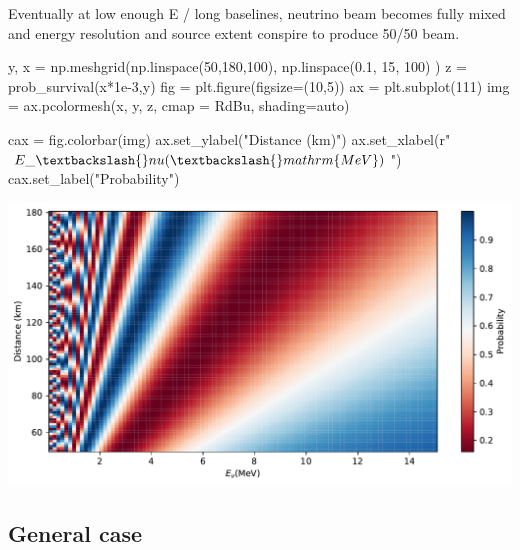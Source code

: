 \documentclass[
  letterpaper,
  DIV=11,
  numbers=noendperiod]{scrreprt}
\newenvironment{Shaded}{\begin{snugshade}}{\end{snugshade}}
\newcommand{\DecValTok}[1]{\textcolor[rgb]{0.68,0.00,0.00}{#1}}
\newcommand{\FloatTok}[1]{\textcolor[rgb]{0.68,0.00,0.00}{#1}}
\newcommand{\NormalTok}[1]{\textcolor[rgb]{0.00,0.23,0.31}{#1}}
\newcommand{\OperatorTok}[1]{\textcolor[rgb]{0.37,0.37,0.37}{#1}}
\newcommand{\StringTok}[1]{\textcolor[rgb]{0.13,0.47,0.30}{#1}}
\newcommand{\VerbatimStringTok}[1]{\textcolor[rgb]{0.13,0.47,0.30}{#1}}
\begin{document}
Eventually at low enough E / long baselines, neutrino beam becomes fully
mixed and energy resolution and source extent conspire to produce 50/50
beam.

\begin{Shaded}
\begin{Highlighting}[]
\NormalTok{y, x }\OperatorTok{=}\NormalTok{ np.meshgrid(np.linspace(}\DecValTok{50}\NormalTok{,}\DecValTok{180}\NormalTok{,}\DecValTok{100}\NormalTok{), np.linspace(}\FloatTok{0.1}\NormalTok{, }\DecValTok{15}\NormalTok{, }\DecValTok{100}\NormalTok{) )}
\NormalTok{z }\OperatorTok{=}\NormalTok{ prob\_survival(x}\OperatorTok{*}\FloatTok{1e{-}3}\NormalTok{,y)}
\NormalTok{fig }\OperatorTok{=}\NormalTok{ plt.figure(figsize}\OperatorTok{=}\NormalTok{(}\DecValTok{10}\NormalTok{,}\DecValTok{5}\NormalTok{))}
\NormalTok{ax }\OperatorTok{=}\NormalTok{ plt.subplot(}\DecValTok{111}\NormalTok{)}
\NormalTok{img }\OperatorTok{=}\NormalTok{ ax.pcolormesh(x, y, z, cmap }\OperatorTok{=} \StringTok{\textquotesingle{}RdBu\textquotesingle{}}\NormalTok{, shading}\OperatorTok{=}\StringTok{\textquotesingle{}auto\textquotesingle{}}\NormalTok{)}

\NormalTok{cax }\OperatorTok{=}\NormalTok{ fig.colorbar(img)}
\NormalTok{ax.set\_ylabel(}\StringTok{"Distance (km)"}\NormalTok{)}
\NormalTok{ax.set\_xlabel(}\VerbatimStringTok{r"$E\_\textbackslash{}nu (\textbackslash{}mathrm\{ MeV\})$"}\NormalTok{)}
\NormalTok{cax.set\_label(}\StringTok{"Probability"}\NormalTok{)}
\end{Highlighting}
\end{Shaded}

\includegraphics{chap3_files/figure-pdf/cell-7-output-1.pdf}

\subsection*{General case}\label{general-case}
\end{document}

